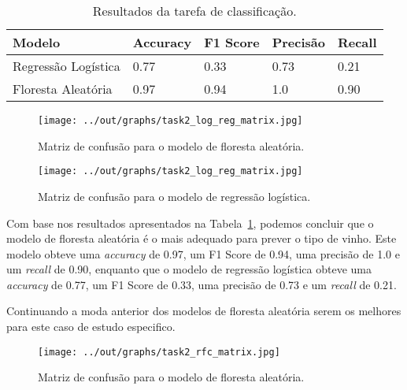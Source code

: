 \documentclass{article}
\begin{document}
    \begin{table}[ht]
        \centering
        \begin{tabular}{@{}lllll@{}}
            \toprule
            Modelo              & Accuracy & F1 Score & Precisão & Recall \\ \midrule
            Regressão Logística & 0.77     & 0.33     & 0.73     & 0.21   \\
            Floresta Aleatória  & 0.97     & 0.94     & 1.0      & 0.90   \\ \bottomrule
        \end{tabular}
        \caption{Resultados da tarefa de classificação.}
        \label{tab:task2_results}
    \end{table}

    \begin{figure}[ht]
        \centering
        \begin{minipage}{0.45\textwidth}
            \centering
            \texttt{[image: ../out/graphs/task2\_log\_reg\_matrix.jpg]}
            \caption{Matriz de confusão para o modelo de floresta aleatória.}
            \label{fig:task2_random_forest_matrix}
        \end{minipage}
        \hfill
        \begin{minipage}{0.45\textwidth}
            \centering
            \texttt{[image: ../out/graphs/task2\_log\_reg\_matrix.jpg]}
            \caption{Matriz de confusão para o modelo de regressão logística.}
            \label{fig:task2_log_reg_matrix}
        \end{minipage}
    \end{figure}

    Com base nos resultados apresentados na Tabela~\ref{tab:task2_results}, podemos concluir que o modelo de floresta aleatória é o mais adequado para prever o tipo de vinho. Este modelo obteve uma \textit{accuracy} de 0.97, um F1 Score de 0.94, uma precisão de 1.0 e um \textit{recall} de 0.90, enquanto que o modelo de regressão logística obteve uma \textit{accuracy} de 0.77, um F1 Score de 0.33, uma precisão de 0.73 e um \textit{recall} de 0.21.

    Continuando a moda anterior dos modelos de floresta aleatória serem os melhores para este caso de estudo especifico.

    \begin{figure}
        \centering
        \begin{minipage}{0.90\textwidth}
            \centering
            \texttt{[image: ../out/graphs/task2\_rfc\_matrix.jpg]}
            \caption{Matriz de confusão para o modelo de floresta aleatória.}
            \label{fig:task2_random_forest_matrix}
        \end{minipage}
    \end{figure}
\end{document}
